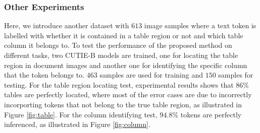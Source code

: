 \documentclass[10pt,twocolumn,letterpaper]{article}
\begin{document}
\subsubsection{Other Experiments}
Here, we introduce another dataset with $613$ image samples where a text token is labelled with whether it is contained in a table region or not and which table column it belongs to. To test the performance of the proposed method on different tasks, two CUTIE-B models are trained, one for locating the table region in document images and another one for identifying the specific column that the token belongs to. $463$ samples are used for training and $150$ samples for testing. For the table region locating test, experimental results shows that $86\%$ tables are perfectly located, where most of the error cases are due to incorrectly incorporting tokens that not belong to the true table region, as illustrated in Figure \ref{fig:table}. For the column identifying test, $94.8\%$ tokens are perfectly inferenced, as illustrated in Figure \ref{fig:column}.
\end{document}
